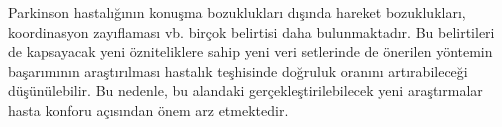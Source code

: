 \documentclass[conference]{IEEEtran}
\begin{document}
Parkinson hastalığının konuşma bozuklukları dışında hareket bozuklukları, koordinasyon zayıflaması vb. birçok belirtisi daha bulunmaktadır. Bu belirtileri de kapsayacak yeni özniteliklere sahip yeni veri setlerinde de önerilen yöntemin başarımının araştırılması hastalık teşhisinde doğruluk oranını artırabileceği düşünülebilir. Bu nedenle, bu alandaki gerçekleştirilebilecek yeni araştırmalar hasta konforu açısından önem arz etmektedir.


%
%


%
%
\end{document}
